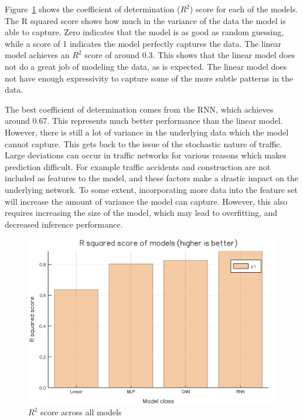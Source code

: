 Figure~\ref{r2_bar} shows the coefficient of determination ($R^2$) score for each of the models.
The R squared score shows how much in the variance of the data the model is able to capture.
Zero indicates that the model is as good as random guessing, while a score of 1 indicates the model perfectly captures the data.
The linear model achieves an $R^2$ score of around 0.3.
This shows that the linear model does not do a great job of modeling the data, as is expected.
The linear model does not have enough expressivity to capture some of the more subtle patterns in the data.

The best coefficient of determination comes from the RNN, which achieves around 0.67.
This represents much better performance than the linear model.
However, there is still a lot of variance in the underlying data which the model cannot capture.
This gets back to the issue of the stochastic nature of traffic.
Large deviations can occur in traffic networks for various reasons which makes prediction difficult.
For example traffic accidents and construction are not included as features to the model, and these factors make a drastic impact on the underlying network.
To some extent, incorporating more data into the feature set will increase the amount of variance the model can capture.
However, this also requires increasing the size of the model, which may lead to overfitting, and decreased inference performance.

\begin{figure}
\includegraphics[width=\linewidth]{images/r2_bar.png}
\caption{$R^2$ score across all models}
\label{r2_bar}
\end{figure}
\clearpage
\newpage

